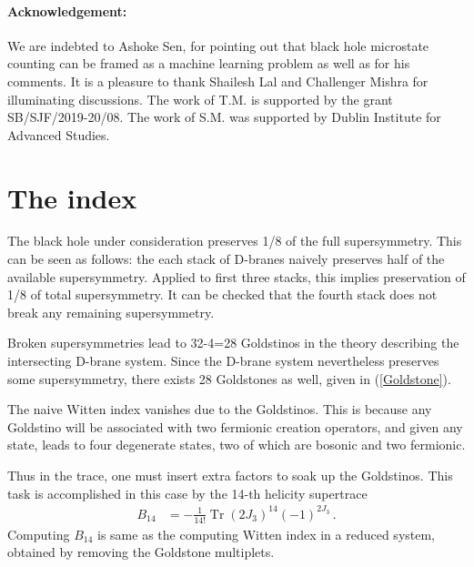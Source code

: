 \documentclass[12pt,a4paper]{JHEP3}
\newcommand{\refb}[1]{(\ref{#1})}
\newcommand{\Tr}{\mathop{\mathrm{Tr}}}
\begin{document}
\paragraph{Acknowledgement:} We are indebted to Ashoke Sen, %
for pointing out that black hole microstate counting can be framed as a machine learning problem as well as for his comments. 
It is a pleasure to thank Shailesh Lal and Challenger  Mishra for illuminating discussions. The work of T.M. is supported by the grant SB/SJF/2019-20/08. The work of S.M. was supported by Dublin Institute for Advanced Studies.
\newpage
\appendix

\section{The index} \label{appindex}
The black hole under consideration preserves 1/8 of the full supersymmetry. This can be seen as follows: the  each stack of D-branes naively preserves half of the available supersymmetry. Applied to first three stacks, this implies preservation of 1/8 of total supersymmetry. It can be checked that the fourth stack does not break any remaining supersymmetry. 

Broken  supersymmetries lead to 32-4=28 Goldstinos in the theory describing the intersecting D-brane system. Since the D-brane system  nevertheless preserves some supersymmetry, there exists 28 Goldstones as well, given in \refb{Goldstone}.

The  naive Witten  index vanishes due to the Goldstinos. This is because any Goldstino will be associated with two fermionic creation operators, and given any state, leads to four degenerate states, two of which are bosonic and two fermionic.

Thus in the trace, one must insert extra factors to soak up the Goldstinos. This task is accomplished in this case by the 14-th helicity  supertrace \cite{Bachas:1996bp, Gregori:1997hi}
\begin{align}
B_{14} &= - \frac{1}{14 !}  \Tr{} (2J_3)^{14} (-1)^{2J_3} \, .
\end{align}
Computing $B_{14}$ is same as the computing Witten index in a reduced system, obtained by removing the Goldstone multiplets. 
\end{document}
